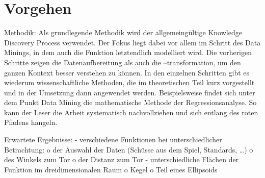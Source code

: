 \section{Vorgehen}
Methodik:
Als grundlegende Methodik wird der allgemeingültige Knowledge Discovery Process verwendet. 
Der Fokus liegt dabei vor allem im Schritt des Data Minings, in dem auch die Funktion letztendlich modelliert wird. Die vorherigen Schritte zeigen die Datenaufbereitung als auch die –transformation, um den ganzen Kontext besser verstehen zu können. In den einzelnen Schritten gibt es wiederum wissenschaftliche Methoden, die im theoretischen Teil kurz vorgestellt und in der Umsetzung dann angewendet werden. Beispielsweise findet sich unter dem Punkt Data Mining die mathematische Methode der Regressionsanalyse. So kann der Leser die Arbeit systematisch nachvollziehen und sich entlang des roten Pfadens hangeln. 

Erwartete Ergebnisse:
-	verschiedene Funktionen bei unterschiedlicher Betrachtung:
o	der Auswahl der Daten (Schüsse aus dem Spiel, Standards, …)
o	des Winkels zum Tor
o	der Distanz zum Tor
-	unterschiedliche Flächen der Funktion im dreidimensionalen Raum
o	Kegel
o	Teil eines Ellipsoids
